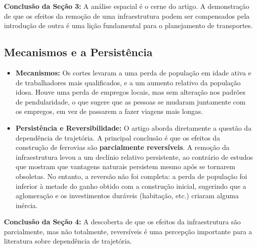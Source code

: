 \documentclass[12pt, a4paper]{article}
\begin{document}
\noindent\textbf{Conclusão da Seção 3:} A análise espacial é o cerne do artigo. A demonstração de que os efeitos da remoção de uma infraestrutura podem ser compensados pela introdução de outra é uma lição fundamental para o planejamento de transportes.

\subsection{Mecanismos e a Persistência}

\begin{itemize}
    \item \textbf{Mecanismos:} Os cortes levaram a uma perda de população em idade ativa e de trabalhadores mais qualificados, e a um aumento relativo da população idosa. Houve uma perda de empregos locais, mas sem alteração nos padrões de pendularidade, o que sugere que as pessoas se mudaram juntamente com os empregos, em vez de passarem a fazer viagens mais longas.
    \item \textbf{Persistência e Reversibilidade:} O artigo aborda diretamente a questão da dependência de trajetória. A principal conclusão é que os efeitos da construção de ferrovias são \textbf{parcialmente reversíveis}. A remoção da infraestrutura levou a um declínio relativo persistente, ao contrário de estudos que mostram que vantagens naturais persistem mesmo após se tornarem obsoletas. No entanto, a reversão não foi completa: a perda de população foi inferior à metade do ganho obtido com a construção inicial, sugerindo que a aglomeração e os investimentos duráveis (habitação, etc.) criaram alguma inércia.
\end{itemize}

\noindent\textbf{Conclusão da Seção 4:} A descoberta de que os efeitos da infraestrutura são parcialmente, mas não totalmente, reversíveis é uma percepção importante para a literatura sobre dependência de trajetória.
\end{document}
